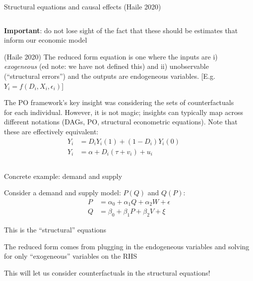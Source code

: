 \documentclass[notes,11pt, aspectratio=169]{beamer}
\newenvironment{wideitemize}{\itemize\addtolength{\itemsep}{10pt}}{\enditemize}
\begin{document}
\begin{frame}{Structural equations and causal effects (Haile 2020)}
\begin{columns}[T] %
  \begin{column}{.7\textwidth}
    \begin{wideitemize}
    \item \textbf{Important}: do not lose sight of the fact that these
      should be estimates that inform our economic model
    \item (Haile 2020) The reduced form equation is one where the
      inputs are i) \emph{exogeneous} (ed note: we have not defined
      this) and ii) unobservable (``structural errors'') and the outputs
      are endogeneous variables. [E.g. $Y_{i} = f(D_{i}, X_{i}, \epsilon_{i})$]
    \item The PO framework's key insight was considering the sets of
      counterfactuals for each individual. However, it is not magic;
      insights can typically map across different notations (DAGs, PO,
      structural econometric equations).  Note that these are
      effectively equivalent:
      \begin{align*}
        Y_{i} &= D_{i}Y_{i}(1) + (1-D_{i})Y_{i}(0)\\
        Y_{i} &= \alpha + D_{i}(\tau + v_{i}) + u_{i}        
      \end{align*}
    \end{wideitemize}
  \end{column}%
  \hfill%
  \begin{column}{.5\textwidth}
  \end{column}
\end{columns}
\end{frame}


\begin{frame}{Concrete example: demand and supply}
  \begin{wideitemize}
  \item Consider a demand and supply model: $P(Q)$ and $Q(P)$:
    \begin{align}
      P &= \alpha_{0} + \alpha_{1}Q + \alpha_{2}W + \epsilon\\
      Q &= \beta_{0} + \beta_{1}P + \beta_{2}V + \xi          
    \end{align}
  \item This is the ``structural'' equations
  \item The reduced form comes from plugging in the endogeneous
    variables and solving for only ``exogeneous'' variables on the RHS
  \item This will let us consider counterfactuals in the structural equations!
  \end{wideitemize}
  
\end{frame}
\end{document}
